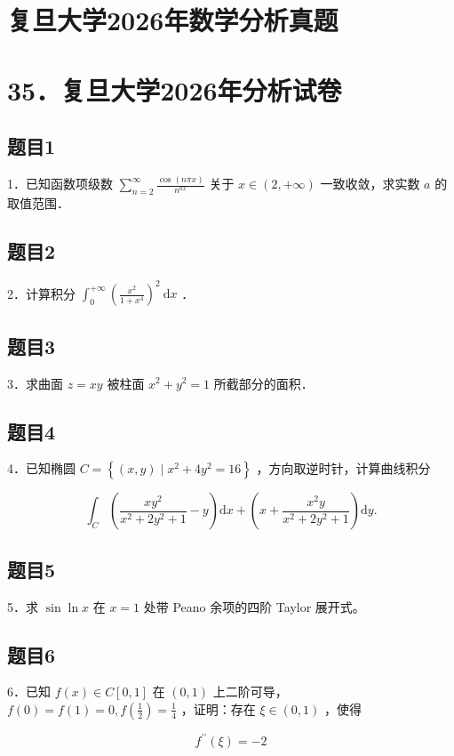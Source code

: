 \documentclass{article}
\begin{document}
\section*{复旦大学2026年数学分析真题}
\section*{35．复旦大学2026年分析试卷}

\subsection{题目1}
1．已知函数项级数 \(\sum_{n=2}^{\infty} \frac{\cos (n \pi x)}{n^{a x}}\) 关于 \(x \in(2,+\infty)\) 一致收敛，求实数 \(a\) 的取值范围．

\subsection{题目2}
2．计算积分 \(\int_{0}^{+\infty}\left(\frac{x^{2}}{1+x^{4}}\right)^{2} \mathrm{~d} x\) ．

\subsection{题目3}
3．求曲面 \(z=x y\) 被柱面 \(x^{2}+y^{2}=1\) 所截部分的面积．

\subsection{题目4}
4．已知椭圆 \(C=\left\{(x, y) \mid x^{2}+4 y^{2}=16\right\}\) ，方向取逆时针，计算曲线积分

\[
\int_{C}\left(\frac{x y^{2}}{x^{2}+2 y^{2}+1}-y\right) \mathrm{d} x+\left(x+\frac{x^{2} y}{x^{2}+2 y^{2}+1}\right) \mathrm{d} y .
\]

\subsection{题目5}
5．求 \(\sin \ln x\) 在 \(x=1\) 处带 Peano 余项的四阶 Taylor 展开式。

\subsection{题目6}
6．已知 \(f(x) \in C[0,1]\) 在 \((0,1)\) 上二阶可导，\(f(0)=f(1)=0, f\left(\frac{1}{2}\right)=\frac{1}{4}\) ，证明：存在 \(\xi \in(0,1)\) ，使得

\[
f^{\prime \prime}(\xi)=-2
\]
\end{document}
